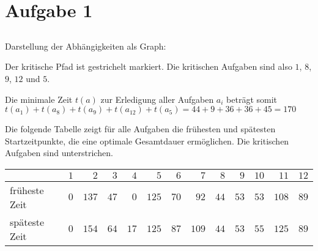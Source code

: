 \documentclass[a4paper]{article}
\begin{document}
\section{Aufgabe 1}

\subsection{}
Darstellung der Abhängigkeiten als Graph:


Der kritische Pfad ist gestrichelt markiert.
Die kritischen Aufgaben sind also $1$, $8$, $9$, $12$ und $5$.

Die minimale Zeit $t(a)$ zur Erledigung aller Aufgaben $a_i$ beträgt somit
$t(a_1) + t(a_8) + t(a_9) + t(a_12) + t(a_5) = 44 + 9 + 36 + 36 + 45 = 170$

Die folgende Tabelle zeigt für alle Aufgaben die frühesten und spätesten
Startzeitpunkte, die eine optimale Gesamtdauer ermöglichen. Die kritischen Aufgaben sind unterstrichen.

\begin{tabular}{lrrrrrrrrrrrr}
\hline
& \underline{$1$} & $2$ & $3$ & $4$ & \underline{$5$} & $6$ & $7$ & \underline{$8$} & \underline{$9$} & $10$ & $11$ & \underline{$12$} \\ 
\hline
früheste Zeit & $0$ & $137$ & $47$ & $0$ & $125$ & $70$ & $92$ & $44$ & $53$ & $53$ & $108$ & $89$ \\
späteste Zeit & $0$ & $154$ & $64$ & $17$ & $125$ & $87$ & $109$ & $44$ & $53$ & $55$ & $125$ & $89$ \\
\hline
\end{tabular}
\end{document}
